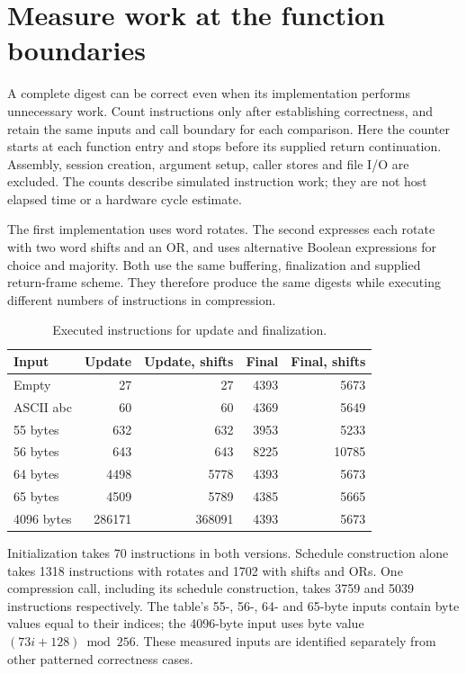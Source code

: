 \section{Measure work at the function boundaries}
A complete digest can be correct even when its implementation performs unnecessary
work. Count instructions only after establishing correctness, and retain the same
inputs and call boundary for each comparison. Here the counter starts at each function
entry and stops before its supplied return continuation. Assembly, session creation,
argument setup, caller stores and file I/O are excluded. The counts describe simulated
instruction work; they are not host elapsed time or a hardware cycle estimate.

The first implementation uses word rotates. The second expresses each rotate with two
word shifts and an OR, and uses alternative Boolean expressions for choice and majority.
Both use the same buffering, finalization and supplied return-frame scheme. They therefore produce the same
digests while executing different numbers of instructions in compression.

\begin{table}[htbp]
\centering\caption{Executed instructions for update and finalization.}
\begin{tabular}{lrrrr}
\toprule
Input & Update & Update, shifts & Final & Final, shifts\\
\midrule
Empty & 27 & 27 & 4393 & 5673\\
ASCII abc & 60 & 60 & 4369 & 5649\\
55 bytes & 632 & 632 & 3953 & 5233\\
56 bytes & 643 & 643 & 8225 & 10785\\
64 bytes & 4498 & 5778 & 4393 & 5673\\
65 bytes & 4509 & 5789 & 4385 & 5665\\
4096 bytes & 286171 & 368091 & 4393 & 5673\\
\bottomrule
\end{tabular}
\end{table}

Initialization takes 70 instructions in both versions. Schedule construction alone
takes 1318 instructions with rotates and 1702 with shifts and ORs. One compression call,
including its schedule construction, takes 3759 and 5039 instructions respectively.
The table's 55-, 56-, 64- and 65-byte inputs contain byte values equal to their indices;
the 4096-byte input uses byte value \((73i+128)\bmod256\). These measured inputs are
identified separately from other patterned correctness cases.

